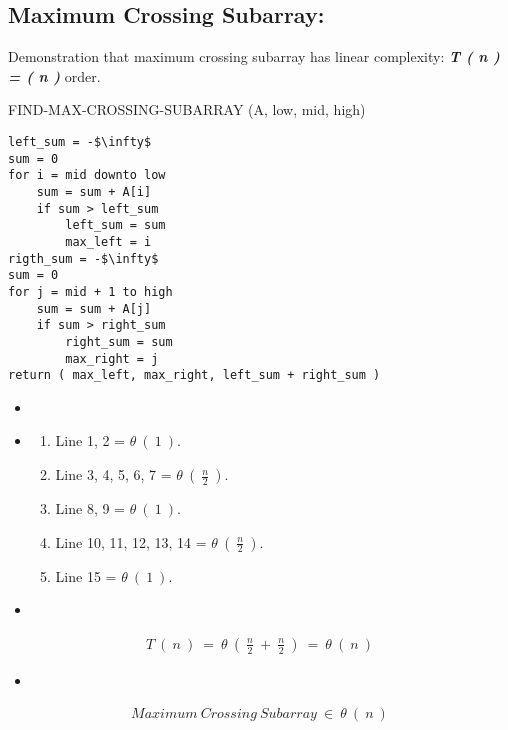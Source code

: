\subsection{Maximum Crossing Subarray:}

Demonstration that maximum crossing subarray has linear complexity: {\bfseries\itshape T ( n ) = ( n ) } order. \hfill \break

{\bfseries\color{Violet}{function}} FIND-MAX-CROSSING-SUBARRAY (A, low, mid, high)
\begin{lstlisting}[mathescape=true]
left_sum = -$\infty$
sum = 0
for i = mid downto low
	sum = sum + A[i]
	if sum > left_sum
		left_sum = sum
		max_left = i
rigth_sum = -$\infty$
sum = 0
for j = mid + 1 to high 
	sum = sum + A[j]
	if sum > right_sum
		right_sum = sum
		max_right = j
return ( max_left, max_right, left_sum + right_sum )
\end{lstlisting} \hfill

\begin{itemize}
\item {\bfseries\itshape\color{carmine}{Demonstration:}} 
\end{itemize} 

\begin{itemize}
\item {\bfseries\itshape\color{Violet}{Analyzing the complexity of each line:}}
\begin{enumerate}
\item Line 1, 2 = $\theta\ (\ 1\ )$.
\item Line 3, 4, 5, 6, 7 = $\theta\ (\ \frac{n}{2}\ )$.
\item Line 8, 9 = $\theta\ (\ 1\ )$.
\item Line 10, 11, 12, 13, 14 = $\theta\ (\ \frac{n}{2}\ )$.
\item Line 15 = $\theta\ (\ 1\ )$.
\end{enumerate}
\end{itemize} \hfill

\begin{itemize}
\item {\bfseries\itshape\color{Violet}{Then, from all lines:}}
\end{itemize} \hfill

\begin{ceqn}
\begin{align}
T\ (\ n\ )\ =\ \theta\ (\ \frac{n}{2}\ +\ \frac{n}{2}\ )\ =\ \theta\ (\ n\ )
\end{align}
\end{ceqn} \hfill

\begin{itemize}
\item {\bfseries\itshape\color{Violet}{Finally:}}
\end{itemize} \hfill

\begin{ceqn}
\begin{align}
Maximum\ Crossing\ Subarray\ \in\ \theta\ (\ n\ )
\end{align}
\end{ceqn}
\pagebreak

